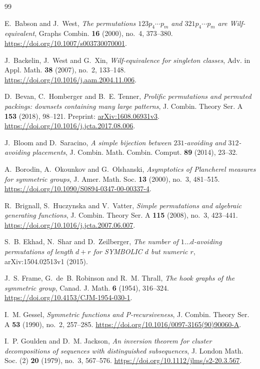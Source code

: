 \documentclass[11pt,reqno]{amsart}
\theoremstyle{plain}
\theoremstyle{definition}
\theoremstyle{remark}
\begin{document}
\begin{thebibliography}{99}

E.~Babson and J.~West, \emph{The permutations $123p_4\cdots p_m$ and $321p_4\cdots p_m$ are Wilf-equivalent}, Graphs Combin. \textbf{16} (2000), no.~4, 373--380. \url{https://doi.org/10.1007/s003730070001}.

J.~Backelin, J.~West and G.~Xin, \emph{Wilf-equivalence for singleton classes}, Adv. in Appl. Math. \textbf{38} (2007), no.~2, 133--148. \url{https://doi.org/10.1016/j.aam.2004.11.006}.

D.~Bevan, C.~Homberger and B.~E. Tenner, \emph{Prolific permutations and permuted packings: downsets containing many large patterns}, J. Combin. Theory Ser. A \textbf{153} (2018), 98--121. Preprint: \href{https://arxiv.org/abs/1608.06931v3}{arXiv:1608.06931v3}. \url{https://doi.org/10.1016/j.jcta.2017.08.006}.

J.~Bloom and D.~Saracino, \emph{A simple bijection between $231$-avoiding and $312$-avoiding placements}, J. Combin. Math. Combin. Comput. \textbf{89} (2014), 23--32.

A.~Borodin, A.~Okounkov and G.~Olshanski, \emph{Asymptotics of Plancherel measures for symmetric groups}, J. Amer. Math. Soc. \textbf{13} (2000), no.~3, 481--515. \url{https://doi.org/10.1090/S0894-0347-00-00337-4}.

R.~Brignall, S.~Huczynska and V.~Vatter, \emph{Simple permutations and algebraic generating functions}, J. Combin. Theory Ser. A \textbf{115} (2008), no.~3, 423--441. \url{https://doi.org/10.1016/j.jcta.2007.06.007}.

S.~B. Ekhad, N.~Shar and D.~Zeilberger, \emph{The number of $1\dots d$-avoiding permutations of length $d+r$ for SYMBOLIC $d$ but numeric $r$}, arXiv:1504.02513v1 (2015).

J.~S. Frame, G.~de~B. Robinson and R.~M. Thrall, \emph{The hook graphs of the symmetric group}, Canad. J. Math. \textbf{6} (1954), 316--324. \url{https://doi.org/10.4153/CJM-1954-030-1}.

I.~M. Gessel, \emph{Symmetric functions and P-recursiveness}, J. Combin. Theory Ser. A \textbf{53} (1990), no.~2, 257--285. \url{https://doi.org/10.1016/0097-3165(90)90060-A}.

I.~P. Goulden and D.~M. Jackson, \emph{An inversion theorem for cluster decompositions of sequences with distinguished subsequences}, J. London Math. Soc. (2) \textbf{20} (1979), no.~3, 567--576. \url{https://doi.org/10.1112/jlms/s2-20.3.567}.


\end{thebibliography}
\end{document}
